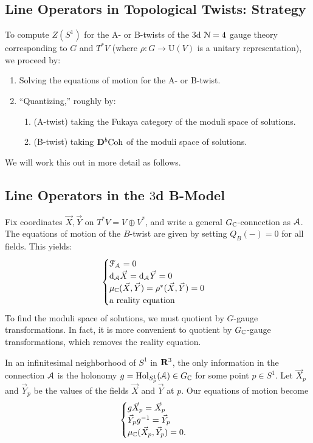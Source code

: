 \subsection{Line Operators in Topological Twists: Strategy}

To compute $Z(S^1)$ for the A- or B-twists of the $3$d $\mathcal{N} = 4$ gauge theory corresponding to $G$ and $T^* V$ (where $\rho: G \to \mathrm{U}(V)$ is a unitary representation), we proceed by:
\begin{enumerate}
    \item Solving the equations of motion for the A- or B-twist.
    \item ``Quantizing,'' roughly by:
    \begin{enumerate}
        \item (A-twist) taking the Fukaya category of the moduli space of solutions.
        \item (B-twist) taking ${\mathbf{D}}^b \mathrm{Coh}$ of the moduli space of solutions.
    \end{enumerate}
\end{enumerate}
We will work this out in more detail as follows.

\subsection{Line Operators in the $3$d B-Model}

Fix coordinates $\vec{X}, \vec{Y}$ on $T^* V = V \oplus V^*$, and write a general $G_{\mathbb{C}}$-connection as $\mathcal{A}$.
The equations of motion of the $B$-twist are given by setting $Q_B(-) = 0$ for all fields.
This yields:
\begin{equation}
    \begin{cases}
        \mathcal{F}_{\mathcal{A}} = 0 \\
        \mathrm{d}_{\mathcal{A}} \vec{X} = \mathrm{d}_{\mathcal{A}} \vec{Y} = 0 \\
        \mu_{\mathbb{C}}(\vec{X}, \vec{Y}) = \rho^*(\vec{X}, \vec{Y}) = 0 \\
        \textrm{a reality equation}
    \end{cases}
\end{equation}
To find the moduli space of solutions, we must quotient by $G$-gauge transformations.
In fact, it is more convenient to quotient by $G_{\mathbb{C}}$-gauge transformations, which removes the reality equation.

In an infinitesimal neighborhood of $S^1$ in $\mathbf{R}^3$, the only information in the connection $\mathcal{A}$ is the holonomy $g = \mathrm{Hol}_{S^1_p}(\mathcal{A}) \in G_{\mathbb{C}}$ for some point $p \in S^1$.
Let $\vec{X}_p$ and $\vec{Y}_p$ be the values of the fields $\vec{X}$ and $\vec{Y}$ at $p$.
Our equations of motion become
\begin{equation}
\begin{cases}
    g \vec{X}_p = \vec{X}_p \\
    \vec{Y}_p g^{-1} = \vec{Y}_p \\
    \mu_{\mathbb{C}}(\vec{X}_p, \vec{Y}_p) = 0.
\end{cases}
\end{equation}


